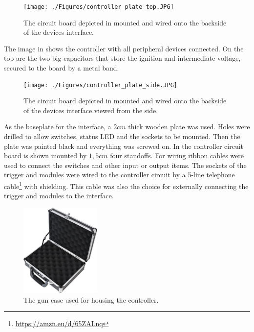 \begin{figure}[!ht]
    \centering
    \texttt{[image: ./Figures/controller\_plate\_top.JPG]}
    \caption{ The circuit board depicted in  mounted and wired onto the backside of the devices interface. }
    \label{fig:controller_plate_top}     
\end{figure}

\noindent The image in  shows the controller with all peripheral devices connected. On the top are the two big capacitors that store the ignition and intermediate voltage, secured to the board by a metal band.\\

\begin{figure}[!ht]
    \centering
    \texttt{[image: ./Figures/controller\_plate\_side.JPG]}
    \caption{ The circuit board depicted in  mounted and wired onto the backside of the devices interface viewed from the side. }
    \label{fig:controller_plate_side}     
\end{figure}

\noindent As the baseplate for the interface, a $2cm$ thick wooden plate was used. Holes were drilled to allow switches, status LED and the sockets to be mounted. Then the plate was painted black and everything was screwed on. In  the controller circuit board is shown mounted by $1,5cm$ four standoffs. For wiring ribbon cables  were used to connect the switches and other input or output items. The sockets of the trigger and modules were wired to the controller circuit by a 5-line telephone cable\footnote{\url{https://amzn.eu/d/65ZALnq}} with shielding. This cable was also the choice for externally connecting the trigger and modules to the interface.   

\pagebreak

\begin{figure}[!ht]
    \centering
    \includegraphics[width=4cm]{./Figures/gn_case.jpg}
    \caption{ The gun case used for housing the controller. }
    \label{fig:gn_case}     
\end{figure}

